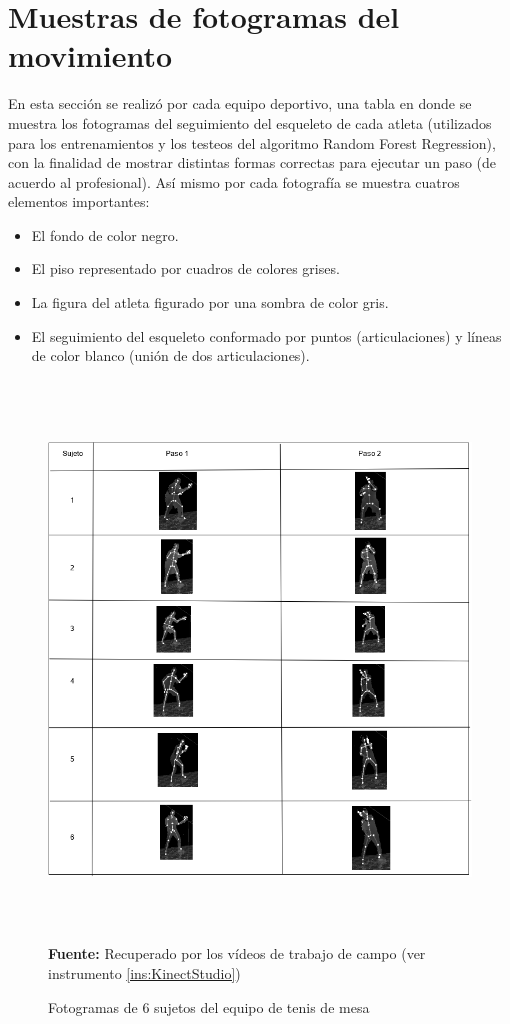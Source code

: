 \section{Muestras de fotogramas del movimiento} \label{res:fotogramas}
En esta secci\'on se realiz\'o por cada equipo deportivo, una tabla en donde se muestra los  fotogramas del seguimiento del  esqueleto de cada atleta (utilizados para los entrenamientos y los testeos del algoritmo Random Forest Regression), con la finalidad de mostrar distintas formas correctas para ejecutar un paso (de acuerdo al profesional). As\'i mismo por cada fotograf\'ia se muestra cuatros elementos importantes:
\begin{itemize}
\item El fondo de color negro.
\item El piso representado por cuadros de colores grises.
\item La figura del atleta figurado por una sombra de color gris.
\item El seguimiento del esqueleto conformado por puntos (articulaciones) y l\'ineas de color blanco (uni\'on de dos articulaciones).
\end{itemize}
\begin{figure}[H]
	\caption{Fotogramas de 6 sujetos del equipo de tenis de mesa}
	\label{fig:fotogramaTenis}
	\centering
	\includegraphics[width=445px,height=560px]{graphics/resultados/SETenisDeMesa.PNG} \\
	\textbf{Fuente:} Recuperado por los v\'ideos de trabajo de campo (ver instrumento \ref{ins:KinectStudio})
\end{figure}
